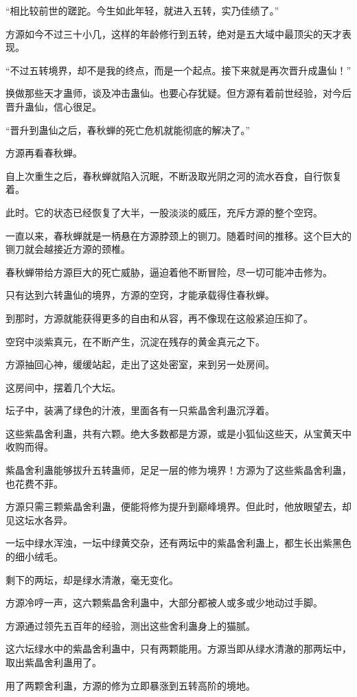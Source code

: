 \begin{this_body}
“相比较前世的蹉跎。今生如此年轻，就进入五转，实乃佳绩了。”

方源如今不过三十小几，这样的年龄修行到五转，绝对是五大域中最顶尖的天才表现。

“不过五转境界，却不是我的终点，而是一个起点。接下来就是再次晋升成蛊仙！”

换做那些天才蛊师，谈及冲击蛊仙。也要心存犹疑。但方源有着前世经验，对今后晋升蛊仙，信心很足。

“晋升到蛊仙之后，春秋蝉的死亡危机就能彻底的解决了。”

方源再看春秋蝉。

自上次重生之后，春秋蝉就陷入沉眠，不断汲取光阴之河的流水吞食，自行恢复着。

此时。它的状态已经恢复了大半，一股淡淡的威压，充斥方源的整个空窍。

一直以来，春秋蝉就是一柄悬在方源脖颈上的铡刀。随着时间的推移。这个巨大的铡刀就会越接近方源的颈椎。

春秋蝉带给方源巨大的死亡威胁，逼迫着他不断冒险，尽一切可能冲击修为。

只有达到六转蛊仙的境界，方源的空窍，才能承载得住春秋蝉。

到那时，方源就能获得更多的自由和从容，再不像现在这般紧迫压抑了。

空窍中淡紫真元，在不断产生，沉淀在残存的黄金真元之下。

方源抽回心神，缓缓站起，走出了这处密室，来到另一处房间。

这房间中，摆着几个大坛。

坛子中，装满了绿色的汁液，里面各有一只紫晶舍利蛊沉浮着。

这些紫晶舍利蛊，共有六颗。绝大多数都是方源，或是小狐仙这些天，从宝黄天中收购而得。

紫晶舍利蛊能够拔升五转蛊师，足足一层的修为境界！方源为了这些紫晶舍利蛊，也花费不菲。

方源只需三颗紫晶舍利蛊，便能将修为提升到巅峰境界。但此时，他放眼望去，却见这坛水各异。

一坛中绿水浑浊，一坛中绿黄交杂，还有两坛中的紫晶舍利蛊上，都生长出紫黑色的细小绒毛。

剩下的两坛，却是绿水清澈，毫无变化。

方源冷哼一声，这六颗紫晶舍利蛊中，大部分都被人或多或少地动过手脚。

方源通过领先五百年的经验，测出这些舍利蛊身上的猫腻。

这六坛绿水中的紫晶舍利蛊中，只有两颗能用。方源当即从绿水清澈的那两坛中，取出紫晶舍利蛊用了。

用了两颗舍利蛊，方源的修为立即暴涨到五转高阶的境地。


\end{this_body}
